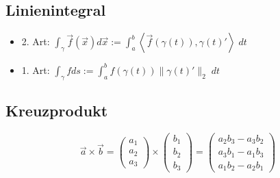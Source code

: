 \subsection{Linienintegral}
\begin{itemize}[leftmargin=*]
	\item 2. Art: $\int_\gamma \vec{f}(\vec{x}) d\vec{x} := \int_a^b \left<
	\vec{f}(\gamma(t)), \gamma(t)' \right>\; dt$
	\item 1. Art: $\int_\gamma f ds := \int_a^b f(\gamma(t)) \|\gamma(t)'\|_2\; dt$
\end{itemize}

\subsection{Kreuzprodukt}
{\footnotesize
\[
\vec{a} \times \vec{b} = \left ( \begin{array}{c} a_1 \\ a_2 \\ a_3 \end{array}
\right ) \times
\left ( \begin{array}{c} b_1 \\ b_2 \\ b_3 \end{array}
\right ) =
\left ( \begin{array}{c} a_2b_3 - a_3b_2 \\ a_3b_1 - a_1b_3 \\ a_1b_2 - a_2b_1
\end{array} \right )
\]
}

